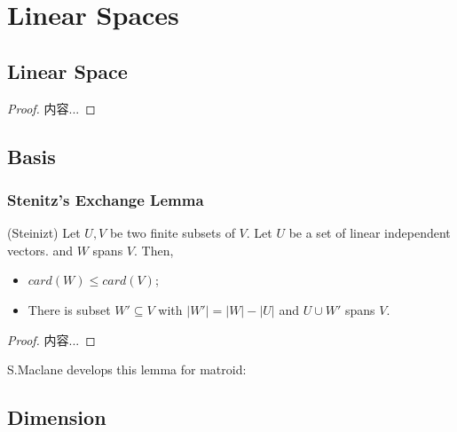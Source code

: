 \documentclass[Total.tex]{subfiles}
\begin{document}
	\chapter{Linear Spaces}
		\section{Linear Space}
		
			\begin{lemma}
				
			\end{lemma}
			
			\begin{proof}
				内容...
			\end{proof}
		\section{Basis}
			
			\subsection{Stenitz's Exchange Lemma}
			
			\begin{lemma}
				(Steinizt) Let $U,V$ be two finite subsets of $V$. Let $U$ be a set of linear independent vectors. and $W$ spans $V$. Then, 
				\begin{itemize}
					\item $card(W)\leq card(V)$;
					\item There is subset $W'\subseteq V$ with $|W'|=|W|-|U|$ and $U\cup W'$ spans $V$.
				\end{itemize}
			\end{lemma}
			
			\begin{proof}
				内容...
			\end{proof}
			
			S.Maclane develops this lemma for matroid:
		\section{Dimension}
			
			
			
\end{document}
